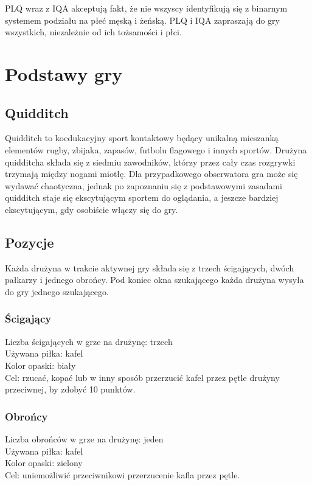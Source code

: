 \documentclass[12pt]{article}
\begin{document}
PLQ wraz z IQA akceptują fakt, że nie wszyscy identyfikują się z
binarnym systemem podziału na płeć męską i żeńską. PLQ i IQA zapraszają
do gry wszystkich, niezależnie od ich tożsamości i płci.

\pagebreak
\section{Podstawy gry}

\subsection{Quidditch}

Quidditch to koedukacyjny sport kontaktowy będący unikalną mieszanką
elementów rugby, zbijaka, zapasów, futbolu flagowego i innych sportów.
Drużyna quidditcha składa się z siedmiu zawodników, którzy przez cały
czas rozgrywki trzymają między nogami miotłę. Dla przypadkowego
obserwatora gra może się wydawać chaotyczna, jednak po zapoznaniu się z
podstawowymi zasadami quidditch staje się ekscytującym sportem do
oglądania, a jeszcze bardziej ekscytującym, gdy osobiście włączy się do
gry.

\subsection{Pozycje}
Każda drużyna w trakcie aktywnej gry składa się z trzech ścigających,
dwóch pałkarzy i jednego obrońcy. Pod koniec okna szukającego każda
drużyna wysyła do gry jednego szukającego.

\subsubsection{Ścigający}
Liczba ścigających w grze na drużynę: trzech \\
Używana piłka: kafel \\
Kolor opaski: biały \\
Cel: rzucać, kopać lub w inny sposób przerzucić kafel przez pętle
drużyny przeciwnej, by zdobyć 10 punktów.

\subsubsection{Obrońcy}
Liczba obrońców w grze na drużynę: jeden \\
Używana piłka: kafel \\
Kolor opaski: zielony \\
Cel: uniemożliwić przeciwnikowi przerzucenie kafla przez pętle.
\end{document}
